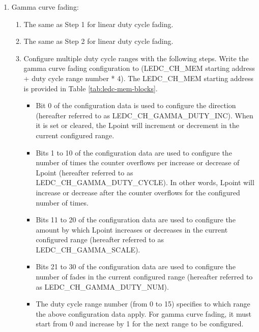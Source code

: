 \documentclass[main\_\_EN.tex]{subfiles}
\begin{document}
\begin{enumerate}
\begin{enumerate}
\begin{enumerate}
            \item Set the \hyperref[fielddesc:LEDCPARAUPCHN]{LEDC\_PARA\_UP\_CH} field to apply the above configurations. After this field is set, the configurations for duty cycle fading will take effect upon the next overflow of the counter, and the PWM generator will output a linear fading PWM signal according to the specified configuration. \hyperref[fielddesc:LEDCPARAUPCHN]{LEDC\_PARA\_UP\_CH} field will be automatically cleared by hardware.
        \end{enumerate}
        \item Gamma curve fading:
        \begin{enumerate}
            \item The same as Step 1 for linear duty cycle fading.
            \item The same as Step 2 for linear duty cycle fading.
            \item Configure multiple duty cycle ranges with the following steps. Write the gamma curve fading configuration to (LEDC\_CH\_MEM starting address + duty cycle range number * 4). The LEDC\_CH\_MEM starting address is provided in Table \ref{tab:ledc-mem-blocks}.
            \begin{itemize}
                \item Bit 0 of the configuration data is used to configure the direction (hereafter referred to as LEDC\_CH\_GAMMA\_DUTY\_INC). When it is set or cleared, the Lpoint will increment or decrement in the current configured range.
                \item Bits 1 to 10 of the configuration data are used to configure the number of times the counter overflows per increase or decrease of Lpoint (hereafter referred to as LEDC\_CH\_GAMMA\_DUTY\_CYCLE). In other words, Lpoint will increase or decrease after the counter overflows for the configured number of times.
                \item Bits 11 to 20 of the configuration data are used to configure the amount by which Lpoint increases or decreases in the current configured range (hereafter referred to as LEDC\_CH\_GAMMA\_SCALE).
                \item Bits 21 to 30 of the configuration data are used to configure the number of fades in the current configured range (hereafter referred to as LEDC\_CH\_GAMMA\_DUTY\_NUM).
                \item The duty cycle range number (from 0 to 15) specifies to which range the above configuration data apply. For gamma curve fading, it must start from 0 and increase by 1 for the next range to be configured.

\end{itemize}
\end{enumerate}
\end{enumerate}
\end{enumerate}
\end{document}
